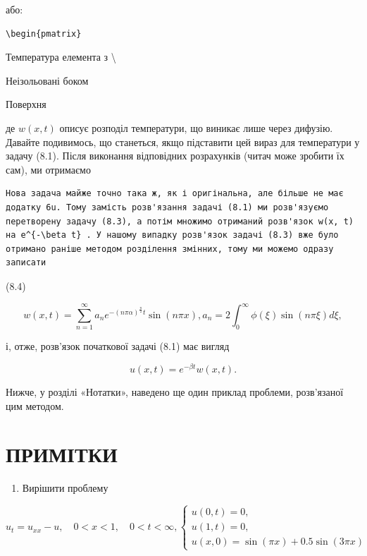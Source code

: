 \documentclass[
  ukrainian,
]{article}
\providecommand{\tightlist}{%
  \setlength{\itemsep}{0pt}\setlength{\parskip}{0pt}}
\begin{document}
або:

\begin{verbatim}
\begin{pmatrix}
\end{verbatim}

Температура елемента з \textbackslash{}

Неізольовані боком

Поверхня

де \(w(x, t)\) описує розподіл температури, що виникає лише через
дифузію. Давайте подивимось, що станеться, якщо підставити цей вираз для
температури у задачу (8.1). Після виконання відповідних розрахунків
(читач може зробити їх сам), ми отримаємо

\begin{verbatim}
Нова задача майже точно така ж, як і оригінальна, але більше не має додатку 6u. Тому замість розв'язання задачі (8.1) ми розв'язуємо перетворену задачу (8.3), а потім множимо отриманий розв'язок w(x, t) на e^{-\beta t} . У нашому випадку розв'язок задачі (8.3) вже було отримано раніше методом розділення змінних, тому ми можемо одразу записати
\end{verbatim}

(8.4)

\[
w(x, t) = \sum_{n=1}^{\infty} a_n e^{-(n\pi\alpha)^{\frac{n}{2}}t} \sin(n\pi x),
a_n = 2 \int_0^{\infty} \phi(\xi) \sin(n\pi \xi) d\xi,
\]

і, отже, розв'язок початкової задачі (8.1) має вигляд

\[
u(x, t) = e^{-\beta t}w(x, t).
\]

Нижче, у розділі «Нотатки», наведено ще один приклад проблеми,
розв'язаної цим методом.

\section{ПРИМІТКИ}\label{ux43fux440ux438ux43cux456ux442ux43aux438}

\begin{enumerate}
\def\labelenumi{\arabic{enumi}.}
\tightlist
\item
  Вирішити проблему
\end{enumerate}

\[
u_t = u_{xx} - u, \quad 0 < x < 1, \quad 0 < t < \infty,
\begin{cases} u(0, t) = 0, \\ u(1, t) = 0, \\ u(x, 0) = \sin(\pi x) + 0.5\sin(3\pi x) \end{cases}
\]
\end{document}

